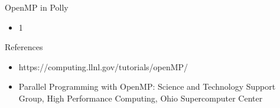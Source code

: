 \documentclass[14pt]{beamer}
\begin{document}
\begin{frame}{OpenMP in Polly}
\begin{itemize}
\item 1
\end{itemize}
\end{frame}


\begin{frame}{References}
\begin{itemize}
\item https://computing.llnl.gov/tutorials/openMP/
\item Parallel Programming with OpenMP: Science and Technology Support Group, High Performance Computing, Ohio Supercomputer Center
\end{itemize}
\end{frame}
\end{document}
